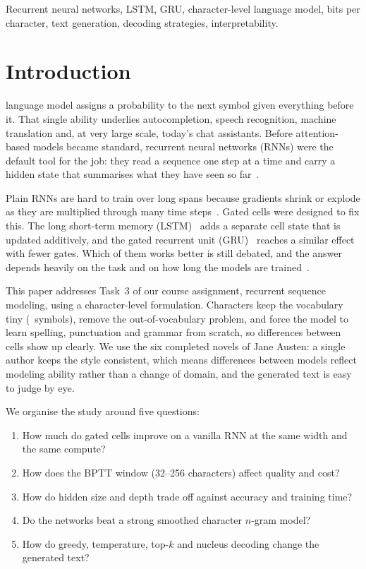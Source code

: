 \documentclass[journal,a4paper]{IEEEtran}
\begin{document}
\begin{IEEEkeywords}
Recurrent neural networks, LSTM, GRU, character-level language model, bits per character, text generation, decoding strategies, interpretability.
\end{IEEEkeywords}

\section{Introduction}
 language model assigns a probability to the next symbol given everything before it. That single ability underlies autocompletion, speech recognition, machine translation and, at very large scale, today's chat assistants. Before attention-based models became standard, recurrent neural networks (RNNs) were the default tool for the job: they read a sequence one step at a time and carry a hidden state that summarises what they have seen so far~\cite{elman1990}.

Plain RNNs are hard to train over long spans because gradients shrink or explode as they are multiplied through many time steps~\cite{bengio1994,pascanu2013}. Gated cells were designed to fix this. The long short-term memory (LSTM)~\cite{hochreiter1997lstm} adds a separate cell state that is updated additively, and the gated recurrent unit (GRU)~\cite{cho2014gru} reaches a similar effect with fewer gates. Which of them works better is still debated, and the answer depends heavily on the task and on how long the models are trained~\cite{chung2014,jozefowicz2015}.

This paper addresses Task~3 of our course assignment, recurrent sequence modeling, using a character-level formulation. Characters keep the vocabulary tiny (\vocab~symbols), remove the out-of-vocabulary problem, and force the model to learn spelling, punctuation and grammar from scratch, so differences between cells show up clearly. We use the six completed novels of Jane Austen: a single author keeps the style consistent, which means differences between models reflect modeling ability rather than a change of domain, and the generated text is easy to judge by eye.

We organise the study around five questions:
\begin{enumerate}
  \item[\textbf{RQ1}] How much do gated cells improve on a vanilla RNN at the same width and the same compute?
  \item[\textbf{RQ2}] How does the BPTT window (32--256 characters) affect quality and cost?
  \item[\textbf{RQ3}] How do hidden size and depth trade off against accuracy and training time?
  \item[\textbf{RQ4}] Do the networks beat a strong smoothed character $n$-gram model?
  \item[\textbf{RQ5}] How do greedy, temperature, top-$k$ and nucleus decoding change the generated text?
\end{enumerate}
\end{document}
